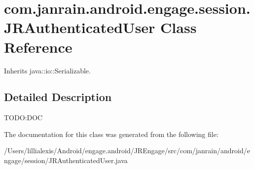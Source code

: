 \hypertarget{classcom_1_1janrain_1_1android_1_1engage_1_1session_1_1_j_r_authenticated_user}{
\section{com.janrain.android.engage.session.JRAuthenticatedUser Class Reference}
\label{classcom_1_1janrain_1_1android_1_1engage_1_1session_1_1_j_r_authenticated_user}
}


Inherits java::io::Serializable.



\subsection{Detailed Description}
TODO:DOC 

The documentation for this class was generated from the following file:\begin{DoxyCompactItemize}
\item 
/Users/lillialexis/Android/engage.android/JREngage/src/com/janrain/android/engage/session/JRAuthenticatedUser.java\end{DoxyCompactItemize}
